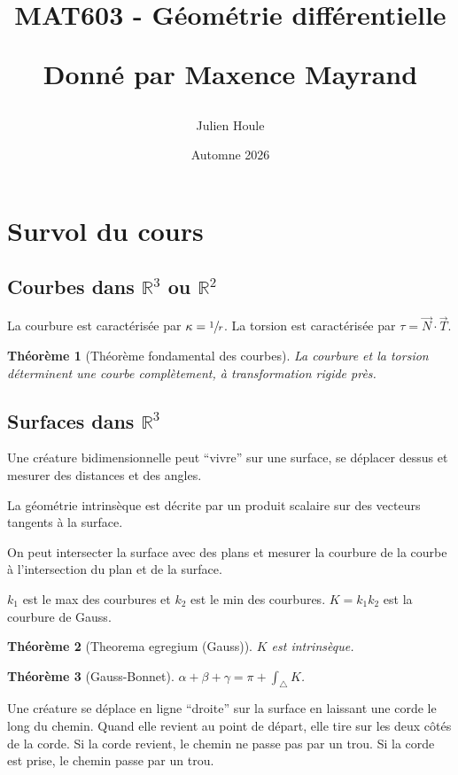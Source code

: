 \documentclass{report}
\title{MAT603 - G\'eom\'etrie diff\'erentielle

	Donn\'e par Maxence Mayrand}
\author{Julien Houle}
\date{Automne 2026}
\newtheorem*{thm}{Th\'eor\`eme}
\theoremstyle{definition}
\theoremstyle{remark}
\def\RR{\mathbb{R}}
\begin{document}
	\maketitle
	\tableofcontents
	\newpage
	\chapter*{Survol du cours}
	\section*{Courbes dans $\RR^3$ ou $\RR^2$}
	La courbure est caract\'eris\'ee par $\kappa=\sfrac{1}{r}$. La torsion est caract\'eris\'ee par $\tau=\vec N \cdot \vec T$.

	\begin{thm}[Th\'eor\`eme fondamental des courbes]
		La courbure et la torsion d\'eterminent une courbe compl\`etement, \`a transformation rigide pr\`es.
	\end{thm}

	\section*{Surfaces dans $\RR^3$}
	Une cr\'eature bidimensionnelle peut ``vivre'' sur une surface, se d\'eplacer dessus et mesurer des distances et des angles.

	La g\'eom\'etrie intrins\`eque est d\'ecrite par un produit scalaire sur des vecteurs tangents \`a la surface.

	On peut intersecter la surface avec des plans et mesurer la courbure de la courbe \`a l'intersection du plan et de la surface.

	$k_1$ est le max des courbures et $k_2$ est le min des courbures. $K=k_1k_2$ est la courbure de Gauss.

	\begin{thm}[Theorema egregium (Gauss)]
		$K$ est intrins\`eque.
	\end{thm}

	\begin{thm}[Gauss-Bonnet]
		$\alpha+\beta+\gamma = \pi + \int_{\triangle}K$.
	\end{thm}

	Une cr\'eature se d\'eplace en ligne ``droite'' sur la surface en laissant une corde le long du chemin. Quand elle revient au point de d\'epart, elle tire sur les deux c\^ot\'es de la corde. Si la corde revient, le chemin ne passe pas par un trou. Si la corde est prise, le chemin passe par un trou.
\end{document}
